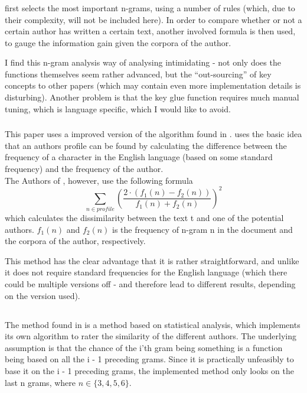 \subsubsection{\cite{nr3}}
\cite{nr3} first selects the most important n-grams, using a number of rules (which, due to their complexity, will not be included here). In order to compare whether or not a certain author has written a certain text, another involved formula is then used, to gauge the information gain given the corpora of the author.

I find this n-gram analysis way of analysing intimidating - not only does the functions themselves seem rather advanced, but the ``out-sourcing'' of key concepts to other papers (which may contain even more implementation details is disturbing). Another problem is that the key glue function requires much manual tuning, which is language specific, which I would like to avoid. 

\subsubsection{\cite{nr2}}
This paper uses a improved version of the algorithm found in \cite{Bennet}. \cite{Bennet} uses the basic idea that an authors profile can be found by calculating the difference between the frequency of a character in the English language (based on some standard frequency) and the frequency of the author.\\

The Authors of \cite{nr2}, however, use the following formula
$$
\sum_{n \in profile}\left(\frac{2 \cdot (f_1(n) - f_2(n))}{f_1(n) + f_2(n)}\right)^2
$$
which calculates the dissimilarity between the text t and one of the potential authors. $f_1(n)$ and $f_2(n)$ is the frequency of n-gram n in the document and the corpora of the author, respectively. 

This method has the clear advantage that it is rather straightforward, and unlike \cite{Bennet} it does not require standard frequencies for the English language (which there could be multiple versions off - and therefore lead to different results, depending on the version used).

\subsection{\cite{nr4}}
The method found in \cite{nr4} is a method based on statistical analysis, which implements its own algorithm to rater the similarity of the different authors. The underlying assumption is that the chance of the i'th gram being something is a function being based on all the i - 1 preceding grams. Since it is practically unfeasibly to base it on the i - 1 preceding grams, the implemented method only looks on the last n grams, where $n \in \{3,4,5,6 \}$. 

